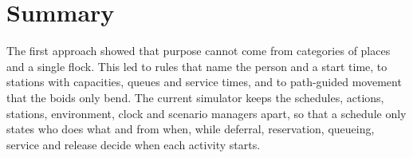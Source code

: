 \endgroup

\section{Summary}\label{sec:contrib-summary}

The first approach showed that purpose cannot come from categories of places and a single flock. This led to rules that name the person and a start time, to stations with capacities, queues and service times, and to path-guided movement that the boids only bend. The current simulator keeps the schedules, actions, stations, environment, clock and scenario managers apart, so that a schedule only states who does what and from when, while deferral, reservation, queueing, service and release decide when each activity starts.
